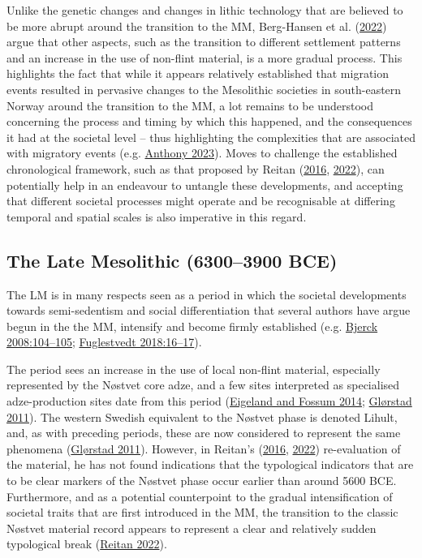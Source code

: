 \documentclass[
  12pt,
  a4paper,
  oneside]{book}
\begin{document}
Unlike the genetic changes and changes in lithic technology that are believed to be more abrupt around the transition to the MM, Berg-Hansen et al. (\protect\hyperlink{ref-berg-hansen2022}{2022}) argue that other aspects, such as the transition to different settlement patterns and an increase in the use of non-flint material, is a more gradual process. This highlights the fact that while it appears relatively established that migration events resulted in pervasive changes to the Mesolithic societies in south-eastern Norway around the transition to the MM, a lot remains to be understood concerning the process and timing by which this happened, and the consequences it had at the societal level -- thus highlighting the complexities that are associated with migratory events (e.g. \protect\hyperlink{ref-anthony2023}{Anthony 2023}). Moves to challenge the established chronological framework, such as that proposed by Reitan (\protect\hyperlink{ref-reitan2016}{2016}, \protect\hyperlink{ref-reitan2022}{2022}), can potentially help in an endeavour to untangle these developments, and accepting that different societal processes might operate and be recognisable at differing temporal and spatial scales is also imperative in this regard.

\hypertarget{the-late-mesolithic-63003900-bce}{%
\subsection{The Late Mesolithic (6300--3900 BCE)}\label{the-late-mesolithic-63003900-bce}}

The LM is in many respects seen as a period in which the societal developments towards semi-sedentism and social differentiation that several authors have argue begun in the the MM, intensify and become firmly established (e.g. \protect\hyperlink{ref-bjerck2008}{Bjerck 2008:104--105}; \protect\hyperlink{ref-fuglestvedt2018}{Fuglestvedt 2018:16--17}).

The period sees an increase in the use of local non-flint material, especially represented by the Nøstvet core adze, and a few sites interpreted as specialised adze-production sites date from this period (\protect\hyperlink{ref-eigeland2014}{Eigeland and Fossum 2014}; \protect\hyperlink{ref-glorstad2011}{Glørstad 2011}). The western Swedish equivalent to the Nøstvet phase is denoted Lihult, and, as with preceding periods, these are now considered to represent the same phenomena (\protect\hyperlink{ref-glorstad2011}{Glørstad 2011}). However, in Reitan's (\protect\hyperlink{ref-reitan2016}{2016}, \protect\hyperlink{ref-reitan2022}{2022}) re-evaluation of the material, he has not found indications that the typological indicators that are to be clear markers of the Nøstvet phase occur earlier than around 5600 BCE. Furthermore, and as a potential counterpoint to the gradual intensification of societal traits that are first introduced in the MM, the transition to the classic Nøstvet material record appears to represent a clear and relatively sudden typological break (\protect\hyperlink{ref-reitan2022}{Reitan 2022}).
\end{document}
